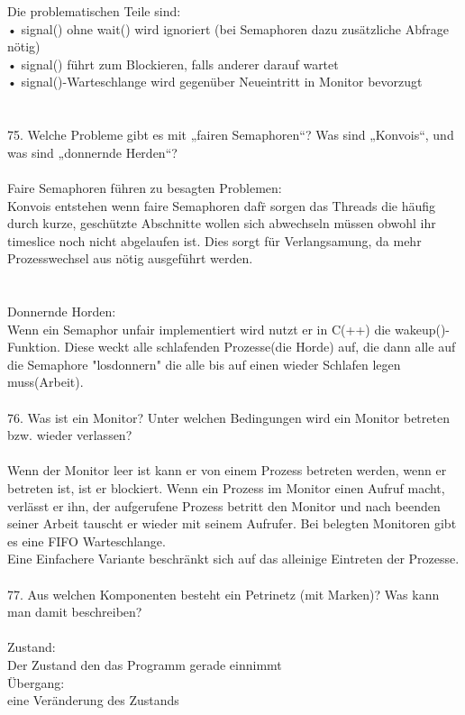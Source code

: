 \documentclass{article}
\newcommand\tab[1][1cm]{\hspace*{#1}}
\begin{document}
Die problematischen Teile sind:\\
• signal() ohne wait() wird ignoriert (bei Semaphoren dazu zusätzliche Abfrage nötig)\\
• signal() führt zum Blockieren, falls anderer darauf wartet\\
• signal()-Warteschlange wird gegenüber Neueintritt in Monitor bevorzugt\\
\\
\\
75. Welche Probleme gibt es mit „fairen Semaphoren“? Was sind „Konvois“, und was sind
„donnernde Herden“?
\\
\\
Faire Semaphoren f\"uhren zu besagten Problemen:\\
\tab Konvois entstehen wenn faire Semaphoren daf\"r sorgen das Threads die h\"aufig durch kurze, gesch\"utzte Abschnitte wollen sich abwechseln m\"ussen obwohl ihr timeslice noch nicht abgelaufen ist. Dies sorgt f\"ur Verlangsamung, da mehr Prozesswechsel aus n\"otig ausgef\"uhrt werden.\\
\\
\\
Donnernde Horden:\\
Wenn ein Semaphor unfair implementiert wird nutzt er in C(++) die wakeup()-Funktion. Diese weckt alle schlafenden Prozesse(die Horde) auf, die dann alle auf die Semaphore "losdonnern" die alle bis auf einen wieder Schlafen legen muss(Arbeit).
\\
\\
76. Was ist ein Monitor? Unter welchen Bedingungen wird ein Monitor betreten bzw. wieder
verlassen?
\\
\\
Wenn der Monitor leer ist kann er von einem Prozess betreten werden, wenn er betreten ist, ist er blockiert. Wenn ein Prozess im Monitor einen Aufruf macht, verl\"asst er ihn, der aufgerufene Prozess betritt den Monitor und nach beenden seiner Arbeit tauscht er wieder mit seinem Aufrufer. Bei belegten Monitoren gibt es eine FIFO Warteschlange.\\
Eine Einfachere Variante beschr\"ankt sich auf das alleinige Eintreten der Prozesse.
\\
\\
77. Aus welchen Komponenten besteht ein Petrinetz (mit Marken)? Was kann man damit
beschreiben?
\\
\\
Zustand:\\
Der Zustand den das Programm gerade einnimmt\\
\"Ubergang:\\
eine Ver\"anderung des Zustands\\
\end{document}
